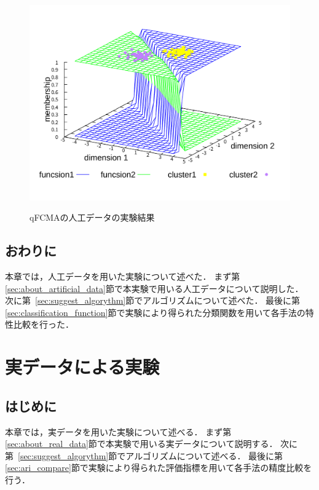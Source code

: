 \documentclass[a4j,12pt,dvipdfmx,oneside]{jsbook}
\theoremstyle{definition}
\begin{document}
\begin{figure}[p]
\begin{minipage}{0.43\hsize}
    \includegraphics[width=\linewidth]{qFCMA-Em11-Lambda10.pdf}
    \label{fig:qFCMA-Em11-Lambda10}
   \end{minipage}
   \vspace*{0.5cm}
   \caption{qFCMAの人工データの実験結果}
   \label{fig:qFCMA}
  \end{figure}
  
  \section{おわりに}\label{sec:artificial_data_summary}
  本章では，人工データを用いた実験について述べた．
  まず第\ref{sec:about_artificial_data}節で本実験で用いる人工データについて説明した．
  次に第~\ref{sec:suggest_algorythm}節でアルゴリズムについて述べた．
  最後に第\ref{sec:classification_function}節で実験により得られた分類関数を用いて各手法の特性比較を行った．
  
  
\chapter{実データによる実験}\label{chap:real_data}

 \section{はじめに}\label{sec:real_data_intro}
 本章では，実データを用いた実験について述べる．
 まず第\ref{sec:about_real_data}節で本実験で用いる実データについて説明する．
 次に第~\ref{sec:suggest_algorythm}節でアルゴリズムについて述べる．
 最後に第\ref{sec:ari_compare}節で実験により得られた評価指標を用いて各手法の精度比較を行う．
 
\end{document}
